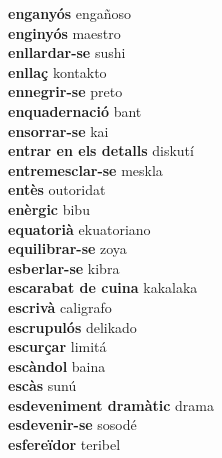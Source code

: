 \textbf{ enganyós  } engañoso \\
\textbf{ enginyós  } maestro \\
\textbf{ enllardar-se  } sushi \\
\textbf{ enllaç  } kontakto \\
\textbf{ ennegrir-se  } preto \\
\textbf{ enquadernació  } bant \\
\textbf{ ensorrar-se  } kai \\
\textbf{ entrar en els detalls  } diskutí \\
\textbf{ entremesclar-se  } meskla \\
\textbf{ entès  } outoridat \\
\textbf{ enèrgic  } bibu \\
\textbf{ equatorià  } ekuatoriano \\
\textbf{ equilibrar-se  } zoya \\
\textbf{ esberlar-se  } kibra \\
\textbf{ escarabat de cuina  } kakalaka \\
\textbf{ escrivà  } caligrafo \\
\textbf{ escrupulós  } delikado \\
\textbf{ escurçar  } limitá \\
\textbf{ escàndol  } baina \\
\textbf{ escàs  } sunú \\
\textbf{ esdeveniment dramàtic  } drama \\
\textbf{ esdevenir-se  } sosodé \\
\textbf{ esfereïdor  } teribel \\
